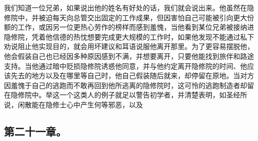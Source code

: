 \par

我们知道一位兄弟，如果说出他的姓名有好处的话，我们就会说出来。他虽然在隐修院中，并被迫每天向总管交出固定的工作成果，但因害怕自己可能被引向更大份额的工作，或因另一位更热心劳作的榜样而感到羞愧，当他看到某位兄弟被接纳进隐修院，凭着他信德的热忱想要完成更大规模的工作时，如果他发现不能通过私下劝说阻止他实现目的，就会用坏建议和耳语说服他离开那里。为了更容易摆脱他，他会假装自己也已经因多种原因感到不满，并想要离开，只要他能找到旅伴和路途支持。当他通过暗中贬损隐修院诱惑他同意，并与他约定离开隐修院的时间、他应该先去的地方以及在哪里等自己时，他自己假装随后就来，却停留在原地。当对方因羞愧于自己的逃跑而不敢再回到他所逃离的隐修院时，这可怜的逃跑制造者却留在隐修院中。举这一个这类人的例子就足以警告初学者，并清楚表明，如圣经所说，闲散能在隐修士心中产生何等邪恶，以及 \par


\subsection{第二十一章。}

\par

